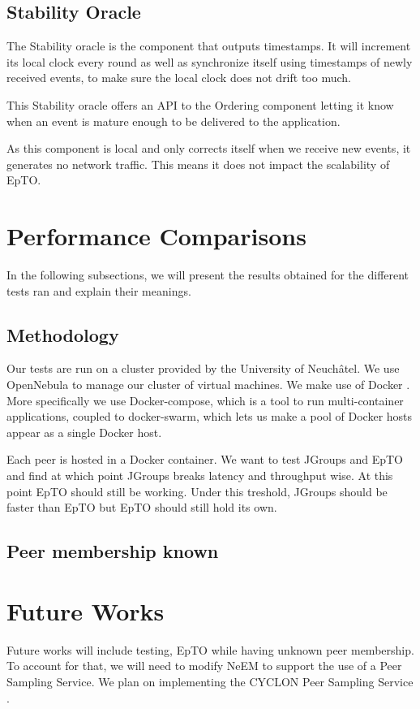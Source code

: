 \documentclass[10pt,conference,a4paper]{IEEEtran}
\begin{document}
\subsection{Stability Oracle}
The Stability oracle is the component that outputs timestamps. It will increment its local clock every round as well as synchronize itself using timestamps of newly received events, to make sure the local clock does not drift too much.
\par
This Stability oracle offers an API to the Ordering component letting it know when an event is mature enough to be delivered to the application.
\par
As this component is local and only corrects itself when we receive new events, it generates no network traffic. This means it does not impact the scalability of EpTO.
\section{Performance Comparisons}
In the following subsections, we will present the results obtained for the different tests ran and explain their meanings.
\subsection{Methodology}
Our tests are run on a cluster provided by the University of Neuchâtel. We use OpenNebula \autocite{opennebula} to manage our cluster of virtual machines. We make use of Docker \autocite{docker}. More specifically we use Docker-compose, which is a tool to run multi-container applications, coupled to docker-swarm, which lets us make a pool of Docker hosts appear as a single Docker host.
\par
Each peer is hosted in a Docker container. We want to test JGroups and EpTO and find at which point JGroups breaks latency and throughput wise. At this point EpTO should still be working. Under this treshold, JGroups should be faster than EpTO but EpTO should still hold its own.
\subsection{Peer membership known}

\section{Future Works}
Future works will include testing, EpTO while having unknown peer membership. To account for that, we will need to modify NeEM to support the use of a Peer Sampling Service. We plan on implementing the CYCLON Peer Sampling Service \autocite{Voulgaris2005}.
\end{document}
